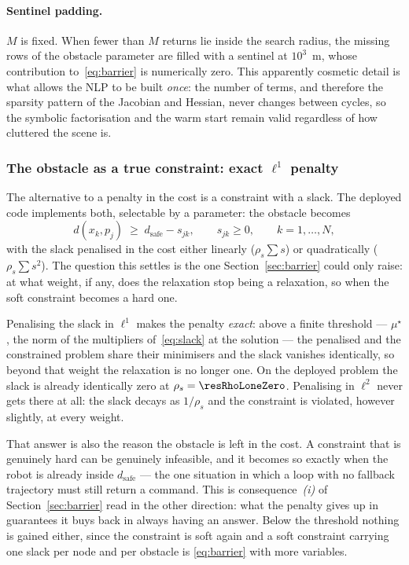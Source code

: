 \documentclass[11pt,a4paper]{article}
\newcommand{\dsafe}{d_{\mathrm{safe}}}
\begin{document}
\paragraph{Sentinel padding.} $M$ is fixed. When fewer than $M$ returns lie inside the search radius, the
missing rows of the obstacle parameter are filled with a sentinel at $10^3$~m, whose contribution
to~\eqref{eq:barrier} is numerically zero. This apparently cosmetic detail is what allows the NLP to be built
\emph{once}: the number of terms, and therefore the sparsity pattern of the Jacobian and Hessian, never
changes between cycles, so the symbolic factorisation and the warm start remain valid regardless of how
cluttered the scene is.

\subsubsection{The obstacle as a true constraint: exact \texorpdfstring{$\ell^1$}{l1} penalty}
\label{sec:l1}

The alternative to a penalty in the cost is a constraint with a slack. The deployed code implements both,
selectable by a parameter: the obstacle becomes
\begin{equation}
  d(x_k,p_j)\;\ge\;\dsafe-s_{jk},\qquad s_{jk}\ge0,\qquad k=1,\dots,N,
  \label{eq:slack}
\end{equation}
with the slack penalised in the cost either linearly ($\rho_s\sum s$) or quadratically ($\rho_s\sum s^2$). The
question this settles is the one Section~\ref{sec:barrier} could only raise: at what weight, if any, does the
relaxation stop being a relaxation, so when the soft constraint becomes a hard one.

Penalising the slack in $\ell^1$ makes the penalty \emph{exact}: above a finite threshold --- $\mu^\star$,
the norm of the multipliers of~\eqref{eq:slack} at the solution --- the penalised and the constrained
problem share their minimisers and the slack vanishes identically, so beyond that weight the relaxation is no longer one.
On the deployed problem the slack is already identically zero at $\rho_s=\resRhoLoneZero$. Penalising in
$\ell^2$ never gets there at all: the slack decays as $1/\rho_s$ and the constraint is violated, however
slightly, at every weight.

That answer is also the reason the obstacle is left in the cost. A constraint that is genuinely hard can be
genuinely infeasible, and it becomes so exactly when the robot is already inside $\dsafe$ --- the one
situation in which a loop with no fallback trajectory must still return a command. This is
consequence~\emph{(i)} of Section~\ref{sec:barrier} read in the other direction: what the penalty gives up
in guarantees it buys back in always having an answer. Below the threshold nothing is gained either, since
the constraint is soft again and a soft constraint carrying one slack per node and per obstacle is
\eqref{eq:barrier} with more variables.
\end{document}
